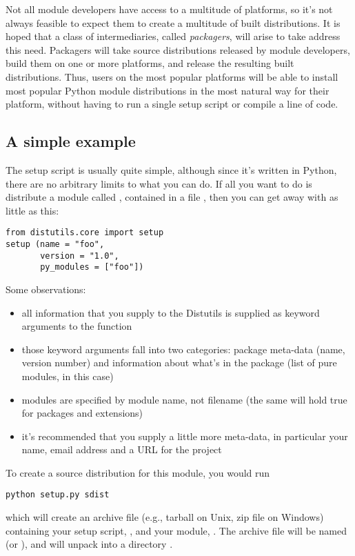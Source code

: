 \documentclass{howto}
\begin{document}
Not all module developers have access to a multitude of platforms, so
it's not always feasible to expect them to create a multitude of built
distributions.  It is hoped that a class of intermediaries, called
\emph{packagers}, will arise to take address this need.  Packagers will
take source distributions released by module developers, build them on
one or more platforms, and release the resulting built distributions.
Thus, users on the most popular platforms will be able to install most
popular Python module distributions in the most natural way for their
platform, without having to run a single setup script or compile a line
of code.


\subsection{A simple example}
\label{sec:simple-example}

The setup script is usually quite simple, although since it's written in
Python, there are no arbitrary limits to what you can do.  If all you
want to do is distribute a module called , contained in a
file , then you can get away with as little as this:
\begin{verbatim}
from distutils.core import setup
setup (name = "foo",
       version = "1.0",
       py_modules = ["foo"])
\end{verbatim}
Some observations:
\begin{itemize}
\item all information that you supply to the Distutils is supplied as
  keyword arguments to the  function
\item those keyword arguments fall into two categories: package
  meta-data (name, version number) and information about what's in the
  package (list of pure modules, in this case)
\item modules are specified by module name, not filename (the same will
  hold true for packages and extensions)
\item it's recommended that you supply a little more meta-data, in
  particular your name, email address and a URL for the project
\end{itemize}

To create a source distribution for this module, you would run
\begin{verbatim}
python setup.py sdist
\end{verbatim}
which will create an archive file (e.g., tarball on Unix, zip file on
Windows) containing your setup script, , and your module,
.  The archive file will be named  (or
), and will unpack into a directory .
\end{document}
